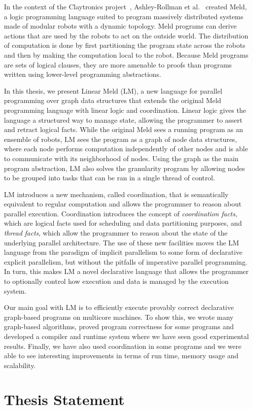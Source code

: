 In the context of the Claytronics project~\cite{goldstein-computer05},
Ashley-Rollman et al.~\cite{ashley-rollman-iclp09,
ashley-rollman-derosa-iros07wksp} created Meld, a logic programming language
suited to program massively distributed systems made of modular robots with a
dynamic topology. Meld programs can derive actions that are used by the
robots to act on the outside world. The distribution of computation is done by
first partitioning the program state across the robots and then by making the
computation local to the robot. Because Meld programs are sets of logical
clauses, they are more amenable to proofs than programs written using
lower-level programming abstractions.

In this thesis, we present Linear Meld (LM), a new language for parallel
programming over graph data structures that extends the original Meld
programming language with linear logic and coordination. Linear logic gives the
language a structured way to manage state, allowing the programmer to assert and
retract logical facts.  While the original Meld sees a running program as an
ensemble of robots, LM sees the program as a graph of node data structures,
where each node performs computation independently of other nodes and is able to
communicate with its neighborhood of nodes. Using the graph as the main program
abstraction, LM also solves the granularity program by allowing nodes to be
grouped into tasks that can be ran in a single thread of control.

LM introduces a new mechanism, called coordination, that is semantically
equivalent to regular computation and allows the programmer to reason about
parallel execution. Coordination introduces the concept of \emph{coordination
facts}, which are logical facts used for scheduling and data partitioning
purposes, and \emph{thread facts}, which allow the programmer to reason about
the state of the underlying parallel architecture. The use of these new
facilities moves the LM language from the paradigm of implicit parallelism to
some form of declarative explicit parallelism, but without the pitfalls of
imperative parallel programming. In turn, this makes LM a novel declarative
language that allows the programmer to optionally control how execution and data
is managed by the execution system.

Our main goal with LM is to efficiently execute provably correct declarative
graph-based programs on multicore machines. To show this, we wrote many
graph-based algorithms, proved program correctness for some programs and
developed a compiler and runtime system where we have seen good experimental
results. Finally, we have also used coordination in some programs and we were
able to see interesting improvements in terms of run time, memory usage and
scalability.

\section{Thesis Statement}



